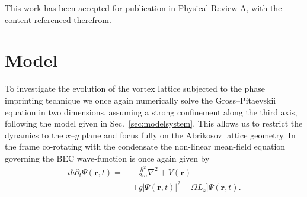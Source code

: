 This work has been accepted for publication in Physical Review A, with the content referenced therefrom.

\section{Model}\label{sec:model}

To investigate the evolution of the vortex lattice subjected to the phase imprinting technique we once again numerically solve the Gross--Pitaevskii equation in two dimensions, assuming a strong confinement along the third axis, following the model given in Sec.~\ref{sec:modelsystem}. This allows us to restrict the dynamics to the $x$--$y$ plane and focus fully on the Abrikosov lattice geometry. In the frame co-rotating with the condensate the non-linear mean-field equation governing the BEC wave-function is once again given by
\begin{align}
	i\hbar\partial_t \Psi(\mathbf{r},t) = \Big[&-\frac{\hbar^2}{2m}\nabla^2 + V\left(\mathbf{r}\right) \nonumber\\
	&+ g\vert \Psi(\mathbf{r},t) \vert^2- \Omega L_z \Big]\Psi(\mathbf{r},t).
\end{align}

